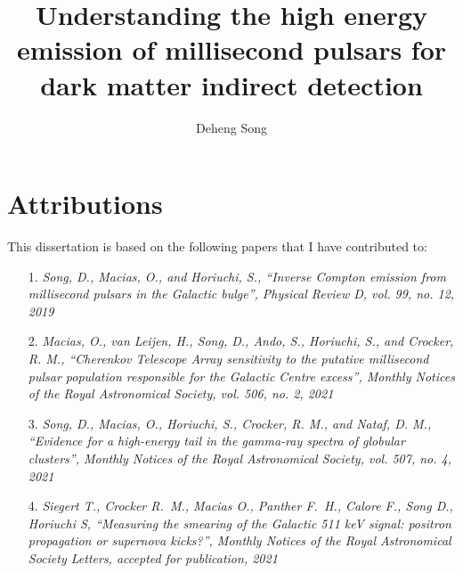 \documentclass[doublespace,nopageskip]{VTthesis} %
\title{Understanding the high energy emission of millisecond pulsars for dark matter indirect detection}
\author{Deheng Song}
\begin{document}
\frontmatter
\maketitle

\chapter*{Attributions}

This dissertation is based on the following papers that I have contributed to:
\begin{itemize}
    \item[1.] \emph{Song, D., Macias, O., and Horiuchi, S., “Inverse Compton emission from millisecond pulsars in the Galactic bulge”, Physical Review D, vol. 99, no. 12, 2019}
    \item[2.] \emph{Macias, O., van Leijen, H., Song, D., Ando, S., Horiuchi, S., and Crocker, R. M., “Cherenkov Telescope Array sensitivity to the putative millisecond pulsar population responsible for the Galactic Centre excess”, Monthly Notices of the Royal Astronomical Society, vol. 506, no. 2, 2021}
    \item[3.] \emph{Song, D., Macias, O., Horiuchi, S., Crocker, R. M., and Nataf, D. M., “Evidence for a high-energy tail in the gamma-ray spectra of globular clusters”, Monthly Notices of the Royal Astronomical Society, vol. 507, no. 4, 2021}
    \item[4.] \emph{Siegert T., Crocker R.~M., Macias O., Panther F.~H., Calore F., Song D., Horiuchi S, “Measuring the smearing of the Galactic 511 keV signal: positron propagation or supernova kicks?”, Monthly Notices of the Royal Astronomical Society Letters, accepted for publication, 2021}
\end{itemize}

\tableofcontents

\listoffigures
\listoftables

\end{document}
